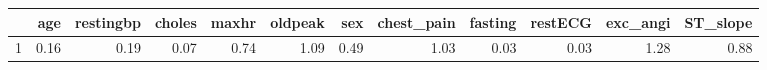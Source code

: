 \begin{table}[ht]
\centering
\begin{tabular}{rrrrrrrrrrrr}
  \hline
 & age & restingbp & choles & maxhr & oldpeak & sex & chest\_pain & fasting & restECG & exc\_angi & ST\_slope \\ 
  \hline
1 & 0.16 & 0.19 & 0.07 & 0.74 & 1.09 & 0.49 & 1.03 & 0.03 & 0.03 & 1.28 & 0.88 \\ 
   \hline
\end{tabular}
\end{table}
